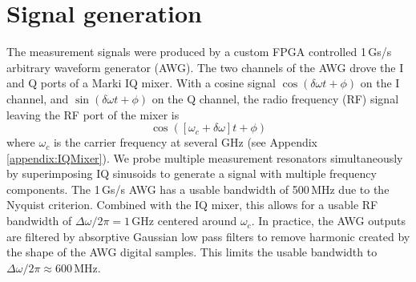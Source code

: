 \section{Signal generation} \label{section:signalGeneration}

The measurement signals were produced by a custom FPGA controlled 1\,Gs/s arbitrary waveform generator (AWG).
The two channels of the AWG drove the I and Q ports of a Marki IQ mixer.
With a cosine signal $\cos \left( \delta \omega t + \phi \right)$ on the I channel, and $\sin \left( \delta \omega t + \phi \right)$ on the Q channel, the radio frequency (RF) signal leaving the RF port of the mixer is \begin{equation}
\cos\left( \left[ \omega_c + \delta\omega \right]t + \phi \right) \end{equation}
where $\omega_c$ is the carrier frequency at several GHz (see Appendix \ref{appendix:IQMixer}).
We probe multiple measurement resonators simultaneously by superimposing IQ sinusoids to generate a signal with multiple frequency components.
The 1\,Gs/s AWG has a usable bandwidth of 500\,MHz due to the Nyquist criterion.
Combined with the IQ mixer, this allows for a usable RF bandwidth of $\Delta\omega/2\pi = 1\,\text{GHz}$ centered around $\omega_c$.
In practice, the AWG outputs are filtered by absorptive Gaussian low pass filters to remove harmonic created by the shape of the AWG digital samples.
This limits the usable bandwidth to $\Delta\omega/2\pi \approx 600\,\text{MHz}$.
